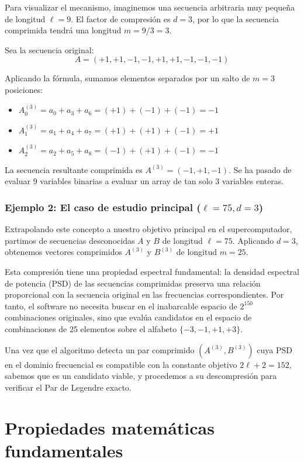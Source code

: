\documentclass[12pt,a4paper]{tfg_domingo}
\begin{document}
Para visualizar el mecanismo, imaginemos una secuencia arbitraria muy pequeña de longitud $\ell=9$. El factor de compresión es $d=3$, por lo que la secuencia comprimida tendrá una longitud $m = 9/3 = 3$.

Sea la secuencia original:
$$A = (+1, +1, -1, -1, +1, +1, -1, -1, -1)$$

Aplicando la fórmula, sumamos elementos separados por un salto de $m=3$ posiciones:
\begin{itemize}
    \item $A^{(3)}_0 = a_0 + a_3 + a_6 = (+1) + (-1) + (-1) = -1$
    \item $A^{(3)}_1 = a_1 + a_4 + a_7 = (+1) + (+1) + (-1) = +1$
    \item $A^{(3)}_2 = a_2 + a_5 + a_8 = (-1) + (+1) + (-1) = -1$
\end{itemize}

La secuencia resultante comprimida es $A^{(3)} = (-1, +1, -1)$. Se ha pasado de evaluar 9 variables binarias a evaluar un array de tan solo 3 variables enteras.

\subsubsection*{Ejemplo 2: El caso de estudio principal ($\ell=75, d=3$)}

Extrapolando este concepto a nuestro objetivo principal en el supercomputador, partimos de secuencias desconocidas $A$ y $B$ de longitud $\ell=75$. Aplicando $d=3$, obtenemos vectores comprimidos $A^{(3)}$ y $B^{(3)}$ de longitud $m=25$.

Esta compresión tiene una propiedad espectral fundamental: la densidad espectral de potencia (PSD) de las secuencias comprimidas preserva una relación proporcional con la secuencia original en las frecuencias correspondientes. Por tanto, el software no necesita buscar en el inabarcable espacio de $2^{150}$ combinaciones originales, sino que evalúa candidatos en el espacio de combinaciones de 25 elementos sobre el alfabeto $\{-3, -1, +1, +3\}$. 

Una vez que el algoritmo detecta un par comprimido $(A^{(3)}, B^{(3)})$ cuya PSD en el dominio frecuencial es compatible con la constante objetivo $2\ell + 2 = 152$, sabemos que es un candidato viable, y procedemos a su descompresión para verificar el Par de Legendre exacto.


\section{Propiedades matemáticas fundamentales}
\end{document}

